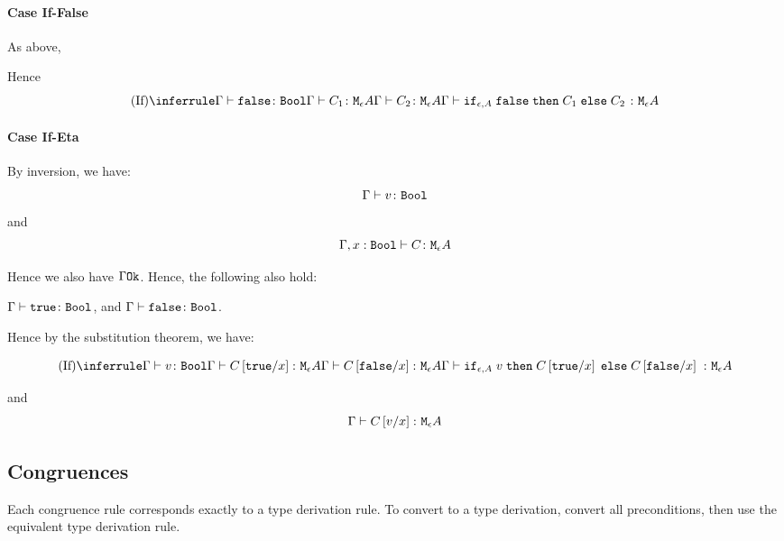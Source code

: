 {    \paragraph{Case If-False}
    As above,

    Hence 
    \begin{equation}
        \ntreeruleIII{If}{
            \gtyperelation{\f}{\B}
        }{
            \gtyperelation{C_1}{\mea}
        }{
            \gtyperelation{C_2}{\mea}
        }{
            \gtyperelation{\ifthenelse{\e}{A}{\f}{C_1}{C_2}}{\mea}
        }
\end{equation}

\paragraph{Case If-Eta}
    By inversion, we have:
    \begin{equation}
        \gtyperelation{v}{\B}
    \end{equation}
    and
    \begin{equation}
        \typerelation{\G, x:\B}{C}{\mea}
    \end{equation}
    
    Hence we also have $\ok{\G}$. Hence, the following also hold:

    $\gtyperelation{\t}{\B}$, and $\gtyperelation{\f}{\B}$.

    Hence by the substitution theorem, we have:

    \begin{equation}
        \ntreeruleIII{If}{
            \gtyperelation{v}{\B}
        }{
            \gtyperelation{C\ssub{x}{\t}}{\mea}
        }{
            \gtyperelation{C\ssub{x}{\f}}{\mea}
        }{\gtyperelation{\ifthenelse{\e}{A}{v}{C\ssub{x}{\t}}{C\ssub{x}{\f}}}{\mea}
        }
    \end{equation}

    and 
    \begin{equation}
        \gtyperelation{C\ssub{x}{v}}{\mea}
    \end{equation}

    

    \subsection{Congruences}
Each congruence rule corresponds exactly to a type derivation rule. To convert to a type derivation, convert all preconditions, then use the equivalent type derivation rule.

}

